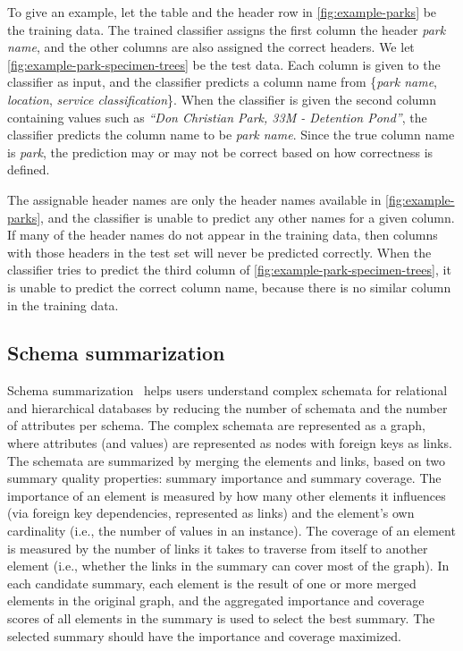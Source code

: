 To give an example, let the table and the header row in \autoref{fig:example-parks} be the training data. The trained classifier assigns the first column the header \textit{park name}, and the other columns are also assigned the correct headers. We let \autoref{fig:example-park-specimen-trees} be the test data. Each column is given to the classifier as input, and the classifier predicts a column name from \{\textit{park name}, \textit{location}, \textit{service classification}\}. When the classifier is given the second column containing values such as \textit{``Don Christian Park, 33M - Detention Pond''}, the classifier predicts the column name to be \textit{park name}. Since the true column name is \textit{park}, the prediction may or may not be correct based on how correctness is defined.

The assignable header names are only the header names available in \autoref{fig:example-parks}, and the classifier is unable to predict any other names for a given column. If many of the header names do not appear in the training data, then columns with those headers in the test set will never be predicted correctly. When the classifier tries to predict the third column of \autoref{fig:example-park-specimen-trees}, it is unable to predict the correct column name, because there is no similar column in the training data.

\subsection{Schema summarization}
\label{ssec:SchemaSummarization}

Schema summarization~\cite{Yu2006Schema} helps users understand complex schemata for relational and hierarchical databases by reducing the number of schemata and the number of attributes per schema. The complex schemata are represented as a graph, where attributes (and values) are represented as nodes with foreign keys as links. The schemata are summarized by merging the elements and links, based on two summary quality properties: summary importance and summary coverage. The importance of an element is measured by how many other elements it influences (via foreign key dependencies, represented as links) and the element's own cardinality (i.e., the number of values in an instance). The coverage of an element is measured by the number of links it takes to traverse from itself to another element (i.e., whether the links in the summary can cover most of the graph). In each candidate summary, each element is the result of one or more merged elements in the original graph, and the aggregated importance and coverage scores of all elements in the summary is used to select the best summary. The selected summary should have the importance and coverage maximized.

